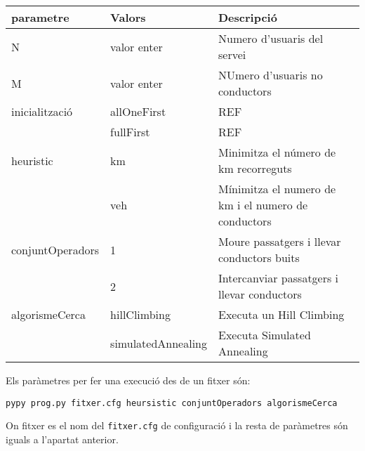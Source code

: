 \small
\begin{center}
\begin{tabularx}{\textwidth}{llX}
\textbf{parametre}  & \textbf{Valors} & \textbf{Descripció}\\
\midrule
N  & valor enter & Numero d'usuaris del servei\\
M  & valor enter & NUmero d'usuaris no conductors\\
\midrule
inicialització & allOneFirst & REF\\
               & fullFirst   & REF\\
\midrule
heuristic      & km  & Minimitza el número de km recorreguts\\
	       & veh & Mínimitza el numero de km i el numero de conductors\\
\midrule
conjuntOperadors      & 1 & Moure passatgers i llevar conductors buits\\
		      & 2 & Intercanviar passatgers i llevar conductors\\
\midrule
algorismeCerca & hillClimbing & Executa un Hill Climbing\\
               & simulatedAnnealing & Executa Simulated Annealing
\end{tabularx}
\end{center}
\normalsize


Els paràmetres per fer una execució des de un fitxer són:

\begin{verbatim}
pypy prog.py fitxer.cfg heursistic conjuntOperadors algorismeCerca
\end{verbatim}

On fitxer es el nom del \texttt{fitxer.cfg} de configuració i la resta de paràmetres són
iguals a l'apartat anterior.



